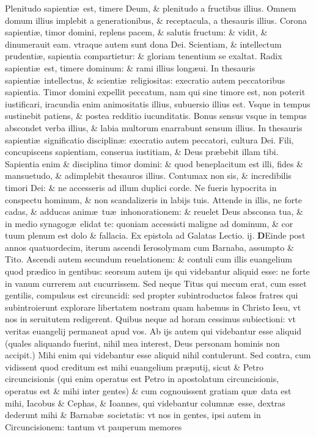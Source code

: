\documentclass[a5paper,10pt]{book}
\def\rightmarginnote{%
	\lrmarginnote{\hskip\columnwidth \hskip -1em}}
\def\ae{æ}
\begin{document}
\begin{multicols*}{2}
Plenitudo sapienti\ae \ est, timere Deum, \& plenitudo a fructibus illius.
Omnem domum illius implebit a generationibus, \& receptacula, a thesauris illius. Corona sapienti\ae , timor domini, replens pacem, \& salutis fructum: \& vidit, \& dinumerauit eam. vtraque autem sunt dona Dei.
Scientiam, \& intellectum prudenti\ae , sapientia compartietur: \& gloriam tenentium se exaltat. Radix sapienti\ae \ est, timere dominum: \& rami illius long\ae ui.
In thesauris sapienti\ae \ intellectus, \& scienti\ae \ religiositas: execratio autem peccatoribus sapientia.
Timor domini expellit
peccatum, nam qui sine timore est, non poterit iustificari, iracundia enim animositatis illius, subuersio illius est.
Vsque in tempus sustinebit patiens, \& postea redditio iucunditatis. Bonus sensus vsque in tempus abscondet verba illius, \& labia multorum enarrabunt sensum illius.
In thesauris sapienti\ae \ significatio disciplin\ae : execratio autem peccatori, cultura Dei.
Fili, concupiscens sapientiam, conserua iustitiam, \& Deus pr\ae bebit illam tibi. Sapientia enim \& disciplina timor domini: \& quod beneplacitum est illi, fides \& mansuetudo, \& adimplebit thesauros illius.
Contumax non sis, \& incredibilis timori Dei: \& ne accesseris ad illum duplici corde. Ne fueris hypocrita in conspectu hominum, \& non scandalizeris in labijs tuis.
Attende in illis, ne forte cadas, \& adducas anim\ae \ tu\ae \ inhonorationem: \& reuelet Deus absconsa tua, \& in medio synagog\ae \ elidat te: quoniam accessisti maligne ad dominum, \& cor tuum plenum est dolo \& fallacia.
\fancyhead[C]{\color{red} Feria. ij. Dominic\ae . j. Vagantium}
\newline \color{red} Ex epistola ad Galatas \hfill Lectio. ij. \color{black}
\vspace{-.25em}
\lettrine[lines=2]{\bfseries \color{red} D}{}Einde\rightmarginnote{ca. 2.} post annos quatuordecim, iterum ascendi Ierosolymam cum Barnaba, assumpto \& Tito.
Ascendi autem secundum reuelationem: \& contuli cum illis euangelium quod pr\ae dico in gentibus: seorsum autem ijs qui videbantur aliquid esse: ne forte in vanum currerem aut cucurrissem.
Sed neque Titus qui mecum erat, cum esset gentilis, compulsus est circuncidi: sed propter subintroductos falsos fratres qui subintroierunt explorare libertatem nostram quam habemus in Christo Iesu, vt nos in seruitutem redigerent.
Quibus neque ad horam cessimus subiectioni: vt veritas euangelij permaneat apud vos.
Ab ijs autem qui videbantur esse aliquid (quales aliquando fuerint, nihil mea interest, Deus personam hominis non accipit.)
Mihi enim qui videbantur esse aliquid nihil contulerunt. Sed contra, cum vidissent quod creditum est mihi euangelium pr\ae putij, sicut \& Petro circuncisionis (qui enim operatus est Petro in apostolatum circuncisionis, operatus est \& mihi inter gentes) \& cum cognouissent gratiam qu\ae \ data est mihi, Iacobus \& Cephas, \& Ioannes, qui videbantur column\ae \ esse, dextras dederunt mihi \& Barnab\ae \ societatis: vt nos in gentes, ipsi autem in Circuncisionem: tantum vt pauperum memores

\end{multicols*}
\end{document}
